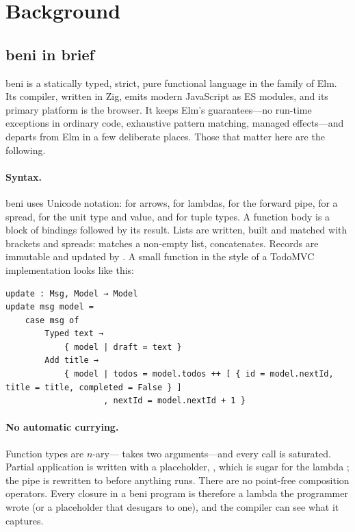\section{Background}
\label{sec:background}

\subsection{beni in brief}
\label{sec:bg-beni}

beni is a statically typed, strict, pure functional language in the family of Elm. Its compiler,
written in Zig, emits modern JavaScript as ES modules, and its primary platform is the browser. It
keeps Elm's guarantees---no run-time exceptions in ordinary code, exhaustive pattern matching,
managed effects---and departs from Elm in a few deliberate places. Those that matter here are the
following.

\paragraph{Syntax.} beni uses Unicode notation:  for arrows,  for lambdas,
 for the forward pipe,  for a spread,  for the unit type and value, and
 for tuple types. A function body is a block of bindings followed by its result. Lists are
written, built and matched with brackets and spreads: \code{[ x, …rest ]} matches a non-empty
list, \code{[ …xs, …ys ]} concatenates. Records are immutable and updated by .
A small  function in the style of a TodoMVC implementation looks like this:
\begin{Verbatim}
update : Msg, Model → Model
update msg model =
    case msg of
        Typed text →
            { model | draft = text }
        Add title →
            { model | todos = model.todos ++ [ { id = model.nextId, title = title, completed = False } ]
                    , nextId = model.nextId + 1 }
\end{Verbatim}

\paragraph{No automatic currying.} Function types are $n$-ary--- takes two
arguments---and every call is saturated. Partial application is written with a placeholder,
, which is sugar for the lambda ; the pipe  is rewritten
to  before anything runs. There are no point-free composition operators. Every closure
in a beni program is therefore a lambda the programmer wrote (or a placeholder that desugars to
one), and the compiler can see what it captures.

